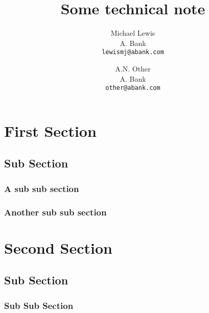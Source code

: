 \documentclass[twocolumn]{article}
\title{Some technical note}
\author{Michael Lewis\\
A. Bank\\
{\tt\small lewismj@abank.com}
\and
A.N. Other\\
A. Bank\\
{\tt\small other@abank.com}
}
\begin{document}
\maketitle

\begin{abstract}
\lipsum[1-1]
\end{abstract}

\tableofcontents

\section{First Section}
	\lipsum[1-2]
	\subsection{Sub Section}
		\subsubsection{A sub sub section}
			\lipsum[1-1]
	\subsubsection{Another sub sub section}
		\lipsum[1-1]
\section{Second Section}
	\subsection{Sub Section}
		\subsubsection{Sub Sub Section}
			\lipsum[1-2]
			
\end{document}
